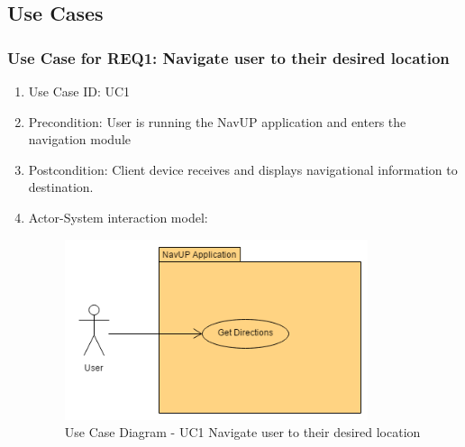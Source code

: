 	\subsection{Use Cases}
	
		\subsubsection{Use Case for REQ1: Navigate user to their desired location}
			\begin{enumerate}
			\renewcommand{\labelenumi}{{\textbf{\arabic{enumi}.}}}
			\item Use Case ID: UC1
			\item Precondition: User is running the NavUP application and enters the navigation module
			\item Postcondition: Client device receives and displays navigational information to destination.
			\item Actor-System interaction model:
				\graphicspath{ {./Diagrams/User/} }
				\begin{figure}[h]
				\caption{Use Case Diagram -  UC1 Navigate user to their desired location}
				\includegraphics[height = 200px]{GetDesiredLocation.png}
				\end{figure}
			\end{enumerate}

